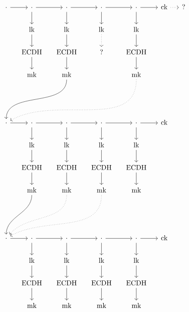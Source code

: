 \documentclass[twoside,letterpaper]{sig-alternate}
\begin{document}
\begin{figure}%
\[\begin{tikzcd}[ampersand replacement=\&, column sep=small]
\cdot \ar[r] \& \cdot \ar[r] \ar[d] \& \cdot \ar[r] \ar[d] \& \cdot \ar[r] \ar[d] \& \cdot \ar[r] \ar[d] \& \ck \ar[r, dotted] \& ? \& \\
 \& \lk \ar[d] \& \lk \ar[d] \& \lk \ar[d, dotted] \& \lk \ar[d] \&  \& \& \\ 
 \& \ECDH \ar[d] \& \ECDH \ar[d] \& ? \& \ECDH\ar[d] \&  \& \& \\
 \& \mk \& \mk \ar[dddll, in=90, out=270] \&  \& \mk \ar[dddllll, dotted, in=30, out=270] \&  \& \& \\
\\
\\
\cdot \ar[r] \& \cdot \ar[r] \ar[d] \& \cdot \ar[r] \ar[d] \& \cdot \ar[r] \ar[d] \& \cdot \ar[r] \ar[d] \& \ck \& \& \\
 \& \lk \ar[d] \& \lk \ar[d] \& \lk \ar[d] \& \lk \ar[d] \&  \& \& \\ 
 \& \ECDH \ar[d] \& \ECDH \ar[d] \& \ECDH \ar[d] \& \ECDH\ar[d] \&  \& \& \\
 \& \mk \ar[dddl, in=90, out=270] \& \mk \ar[dddll, dotted, in=50, out=270] \& \mk \ar[dddlll, dotted, in=30, out=270] \& \mk \&  \& \& \\
\\
\\
\cdot \ar[r] \& \cdot \ar[r] \ar[d] \& \cdot \ar[r] \ar[d] \& \cdot \ar[r] \ar[d] \& \cdot \ar[r] \ar[d] \& \ck \& \& \\
 \& \lk \ar[d] \& \lk \ar[d] \& \lk \ar[d] \& \lk \ar[d] \&  \& \& \\ 
 \& \ECDH \ar[d] \& \ECDH \ar[d] \& \ECDH \ar[d] \& \ECDH\ar[d] \&  \& \& \\
 \& \mk \& \mk \& \mk \& \mk \&  \& \& \\
\end{tikzcd}\]
\end{figure}








\end{document}
